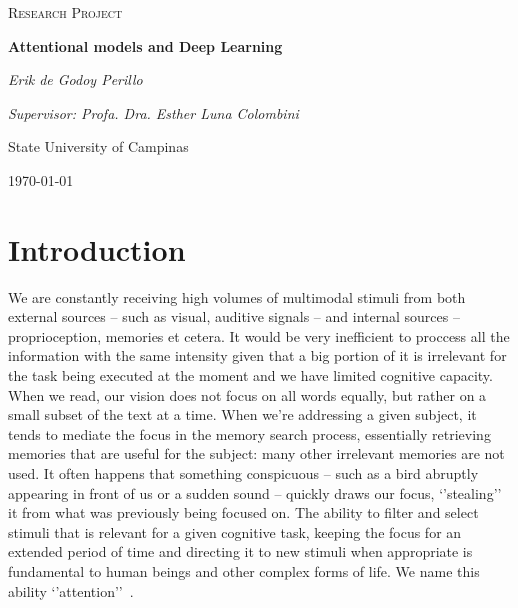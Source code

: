 \documentclass[article]{IEEEtran}
\begin{document}
\begin{titlepage}
	\centering
	{\scshape\Large Research Project\par}
	\vspace{1.5cm}
	{\huge \bfseries Attentional models and Deep Learning\par}
	\vspace{1cm}
	{\itshape Erik de Godoy Perillo\par}
	{\itshape Supervisor: Profa. Dra. Esther Luna Colombini\par}
	\vspace{0.5cm}
	\begin{abstract}
        Attention is a fundamental mechanism in intelligent beings.
        It is necessary for filtering the big volumes of stimuli
        constantly arriving and selecting information that is
        important for a certain task.
        Deep Learning is currently broadly applied to Artificial Intelligence.
        The use of attention concepts in current models
        has also been increasingly frequent, resulting many times in
        better results for the task being addressed.
        In this context, this work proposes the elaboration of
        attentional models based on Deep Learning for problems in Artificial
        Ingelligence.
        We aim at obtaining frameworks more generically applicable in broad
        problem classes such as computer vision, Natural Language Processing,
        Differential Computation and others.
	\end{abstract}
	\vfill
	State University of Campinas
	\vfill
	{\large \today\par}
\end{titlepage}

\section{Introduction}
We are constantly receiving high volumes of multimodal stimuli
from both external sources -- such as visual, auditive signals --
 and internal sources -- proprioception, memories et cetera.
It would be very inefficient to proccess all the information with
the same intensity given that a big portion of it is irrelevant for
the task being executed at the moment and we have limited cognitive capacity.
When we read, our vision does not focus on all
words equally, but rather on a small subset of the text at a time.
When we're addressing a given subject, it tends to mediate the focus
in the memory search process, essentially retrieving memories that
are useful for the subject: many other irrelevant memories are not used.
It often happens that something conspicuous
-- such as a bird abruptly appearing in front of us or a sudden sound --
quickly draws our focus, `'stealing'' it from what was previously
being focused on.
The ability to filter and select stimuli that is relevant for a given
cognitive task, keeping the focus for an extended period of time and
directing it to new stimuli when appropriate is fundamental to
human beings and other complex forms of life.
We name this ability `'attention''~\cite{ref:esther-thesis}.
\end{document}
